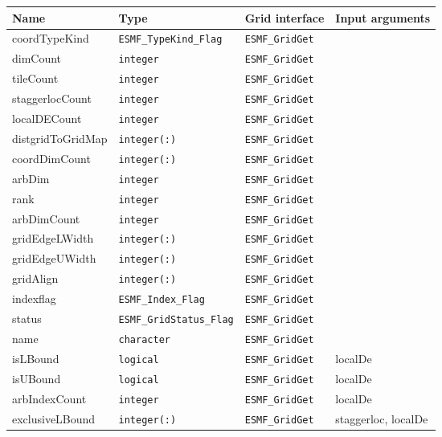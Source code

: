 \begin{tabular}{|l|l|l|l|}
    {\bf Name} & {\bf Type} & {\bf Grid interface} & {\bf Input arguments}\\
    \hline\hline
    coordTypeKind & {\tt ESMF\_TypeKind\_Flag} & {\tt ESMF\_GridGet} & \\
    dimCount & {\tt integer} & {\tt ESMF\_GridGet} & \\
    tileCount & {\tt integer} & {\tt ESMF\_GridGet} & \\
    staggerlocCount & {\tt integer} & {\tt ESMF\_GridGet} & \\
    localDECount & {\tt integer} & {\tt ESMF\_GridGet} & \\
    distgridToGridMap & {\tt integer(:)} & {\tt ESMF\_GridGet} & \\
    coordDimCount & {\tt integer(:)} & {\tt ESMF\_GridGet} & \\
    arbDim & {\tt integer} & {\tt ESMF\_GridGet} & \\
    rank & {\tt integer} & {\tt ESMF\_GridGet} & \\
    arbDimCount & {\tt integer} & {\tt ESMF\_GridGet} & \\
    gridEdgeLWidth & {\tt integer(:)} & {\tt ESMF\_GridGet} & \\
    gridEdgeUWidth & {\tt integer(:)} & {\tt ESMF\_GridGet} & \\
    gridAlign & {\tt integer(:)} & {\tt ESMF\_GridGet} & \\
    indexflag & {\tt ESMF\_Index\_Flag} & {\tt ESMF\_GridGet} & \\
    status & {\tt ESMF\_GridStatus\_Flag} & {\tt ESMF\_GridGet} & \\
    name & {\tt character} & {\tt ESMF\_GridGet} & \\
    isLBound & {\tt logical} & {\tt ESMF\_GridGet} & localDe\\
    isUBound & {\tt logical} & {\tt ESMF\_GridGet} & localDe\\
    arbIndexCount & {\tt integer} & {\tt ESMF\_GridGet} & localDe\\
    exclusiveLBound & {\tt integer(:)} & {\tt ESMF\_GridGet} & staggerloc, localDe\\

\end{tabular}

